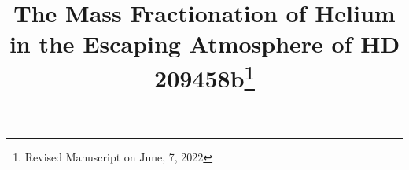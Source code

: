 \documentclass[journal, onecolumn]{aastex631}
\begin{document}
\begin{CJK*}{UTF8}{gbsn}

\title{The Mass Fractionation of Helium in the Escaping Atmosphere of HD 209458b\footnote{Revised Manuscript on June, 7, 2022}}




\end{CJK*}
\end{document}
